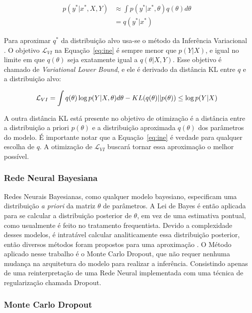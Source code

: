 \begin{align*}
  \label {eq:pq}
    p(y^* | x^* , X,Y) &\approx \int  p(y^* | x^*,\theta) q(\theta)d\theta \\
                       &= q(y^* | x^*)
\end{align*}

 Para aproximar $q^*$ da distribuição alvo usa-se o método da Inferência
Variacional \citep{bayesml}. O objetivo $\mathcal{L}_{VI}$ na
Equação~\ref{eq:ine} é sempre menor que $p(Y|X)$, e igual no limite em que
$q(\theta)$ seja exatamente igual a $q(\theta | X,Y)$. Esse objetivo é chamado de
\textit{Variational Lower Bound}, e ele é derivado da distância KL entre $q$ e
a distribuição alvo:

\begin{equation}
  \label {eq:ine}
  \mathcal{L}_{VI} = \int q(\theta) \log p(Y | X,\theta)d\theta - \mathnormal{KL}(q(\theta) ||p(\theta)) \\
                  \leq \log p(Y|X)
\end{equation}

A outra distância KL está presente no objetivo de otimização é a
distância entre a distribuição a priori $p(\theta)$ e a distribuição aproximada
$q(\theta)$ dos parâmetros do modelo. É importante notar que a Equação~\ref{eq:ine} é verdade para qualquer escolha de
$q$. A otimização de $\mathcal{L}_{VI}$ buscará tornar essa aproximação o melhor possível.


\subsubsection{Rede Neural Bayesiana}

Redes Neurais Bayesianas, como qualquer modelo bayesiano, especificam uma distribuição \textit{a priori} da matriz $\theta$ de parâmetros.
A Lei de Bayes é então aplicada para se calcular a distribuição posterior de
$\theta$, em vez de uma estimativa pontual, como usualmente é feito no tratamento frequentista.
Devido a complexidade desses modelos, é intratável calcular analiticamente essa distribuição posterior, então diversos métodos foram propostos para uma aproximação \citep{Gal2016Uncertainty}.
O Método aplicado nesse trabalho é o Monte Carlo Dropout, que não requer nenhuma mudança na arquitetura do modelo para realizar a inferência. Consistindo apenas de uma reinterpretação de uma Rede Neural implementada com uma técnica de regularização chamada Dropout. 

\subsubsection{Monte Carlo Dropout}

